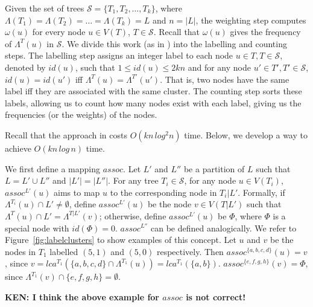 \documentclass[final,1p,times]{elsarticle}
\newcommand{\leafset}{\Lambda}
\newcommand{\weight}{\omega}
\begin{document}
    Given the set of trees $\mathcal{S} = \{T_1, T_2, \ldots, T_k\}$, where $\leafset(T_1) = \leafset(T_2) = \ldots = \leafset(T_k) = L$ and $n = |L|$, the weighting step computes $\weight(u)$ for every node $u \in V(T)$, $T \in \mathcal{S}$. Recall that $\weight(u)$ gives the frequency of $\leafset^T(u)$ in $\mathcal{S}$. We divide this work (as in \cite{gawrychowski2017faster}) into the labelling and counting steps. The labelling step assigns an integer label to each node $u \in T, T \in \mathcal{S}$, denoted by $id(u)$, such that $1 \leq id(u) \leq 2kn$ and for any node $u' \in T', T' \in \mathcal{S}$, $id(u) = id(u')$ iff $\leafset^T(u) = \leafset^{T'}(u')$. That is, two nodes have the same label iff they are associated with the same cluster. The counting step sorts these labels, allowing us to count how many nodes exist with each label, giving us the frequencies (or the weights) of the nodes.

    Recall that the approach in \cite{gawrychowski2017faster} costs $O(kn\,log^2n)$ time. Below, we develop a way to achieve $O(kn\,log\,n)$ time.

    We first define a mapping $assoc$. Let $L'$ and $L''$ be a partition of $L$ such that $L = L' \cup L''$ and $|L'|=|L''|$.
    For any tree $T_i \in \mathcal{S}$, for any node $u \in V(T_i)$, $assoc^{L'}(u)$ aims to map $u$ to the corresponding node in $T_i|L'$. Formally, if $\Lambda^{T_i}(u) \cap L' \neq \emptyset$, 
    define $assoc^{L'}(u)$ be the node $v \in V(T|L')$ such that $\Lambda^T(u) \cap L' = \Lambda^{T|L'}(v)$; otherwise, define $assoc^{L'}(u)$ be $\Phi$, where $\Phi$ is a special node with $id(\Phi) = 0$.
    $assoc^{L''}$ can be defined analogically.  We refer to Figure~\ref{fig:labelclusters} to show examples of this concept. Let $u$ and $v$ be the nodes in $T_1$ labelled $(5, 1)$ and $(5, 0)$ respectively. Then $assoc^{\{a, b, c, d\}}(u) = v$, since $v = lca^{T_1}(\{a, b, c, d\} \cap \leafset^{T_1}(u)) = lca^{T_1}(\{a, b\})$. $assoc^{\{e, f, g, h\}}(v) = \Phi$, since $\leafset^{T_1}(v) \cap \{e, f, g, h\} = \emptyset$.

    {\bf KEN: I think the above example for $assoc$ is not correct!}
    
\end{document}

